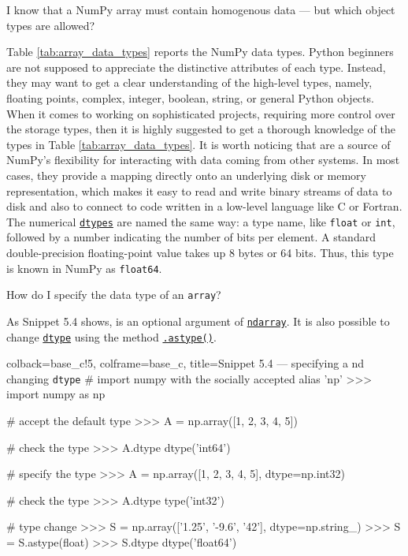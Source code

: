 \documentclass[a4paper,11pt]{book}
\numberwithin{figure}{chapter}
\numberwithin{table}{chapter}
\newcommand{\question}[1]{%
    \begin{tcolorbox}[colback=comp_c!10,colframe=comp_c,sidebyside align=top,width=\linewidth,before skip=1ex]
        #1
    \end{tcolorbox}
    \switchcolumn%
}
\newcommand{\note}[1]{%
    \begin{tcolorbox}[colback=white!0,colframe=white!10,width=\linewidth,before skip=1ex]
        #1
    \end{tcolorbox}
}
\begin{document}
\begin{paracol}{2}
	\question{\raggedright I know that a NumPy array must contain homogenous data --- but which object types are allowed?}
	\note{Table \ref{tab:array_data_types} reports the NumPy data types. Python beginners are not supposed to appreciate the distinctive attributes of each type. Instead, they may want to get a clear understanding of the high-level types, namely, floating points, complex, integer, boolean, string, or general Python objects. When it comes to working on sophisticated projects, requiring more control over the storage types, then it is highly suggested to get a thorough knowledge of the types in Table \ref{tab:array_data_types}. It is worth noticing that \href{https://numpy.org/doc/stable/reference/generated/numpy.ndarray.dtype.html}{\texxttt{dtypes}} are a source of NumPy's flexibility for interacting with data coming from other systems. In most cases, they provide a mapping directly onto an underlying disk or memory representation, which makes it easy to read and write binary streams of data to disk and also to connect to code written in a low-level language like C or Fortran. The numerical \href{https://numpy.org/doc/stable/reference/generated/numpy.ndarray.dtype.html}{\texttt{dtypes}} are named the same way: a type name, like \texttt{float} or \texttt{int}, followed by a number indicating the number of bits per element. A standard double-precision floating-point value takes up 8 bytes or 64 bits. Thus, this type is known in NumPy as \texttt{float64}.}
\end{paracol}

\begin{paracol}{2}
	\question{\raggedright How do I specify the data type of an \texttt{array}?}
	\note{As Snippet 5.4 shows, \href{https://numpy.org/doc/stable/reference/generated/numpy.ndarray.dtype.html}{\textttt{dtype}} is an optional argument of \href{https://numpy.org/doc/stable/reference/generated/numpy.ndarray.html}{\texttt{ndarray}}. It is also possible to change \href{https://numpy.org/doc/stable/reference/generated/numpy.ndarray.dtype.html}{\texttt{dtype}} using the method \href{https://numpy.org/doc/stable/reference/generated/numpy.ndarray.astype.html}{\texttt{.astype()}}.}
\end{paracol}

\begin{pythoncode}[linenos=true,]{colback=base_c!5, colframe=base_c, title=\sffamily Snippet 5.4 --- specifying a nd changing \texttt{dtype}}
# import numpy with the socially accepted alias 'np'
>>> import numpy as np

# accept the default type
>>> A = np.array([1, 2, 3, 4, 5])

# check the type
>>> A.dtype
dtype('int64')

# specify the type
>>> A = np.array([1, 2, 3, 4, 5], dtype=np.int32)

# check the type
>>> A.dtype
type('int32')

# type change 
>>> S = np.array(['1.25', '-9.6', '42'], dtype=np.string_)
>>> S = S.astype(float)
>>> S.dtype
dtype('float64')

\end{pythoncode}
\end{document}
